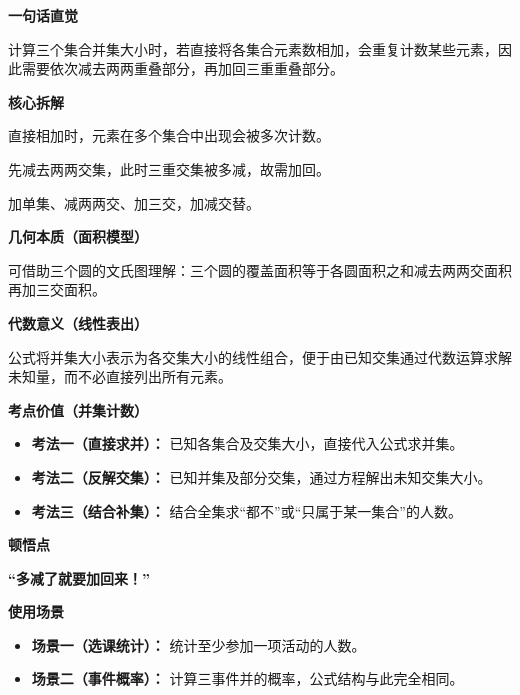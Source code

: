\begin{explanationbox}
	\textbf{\textcolor{CExplanation}{一句话直觉}}

	计算三个集合并集大小时，若直接将各集合元素数相加，会重复计数某些元素，因此需要依次减去两两重叠部分，再加回三重重叠部分。

	\medskip
	\textbf{\textcolor{CExplanation}{核心拆解}}
	\begin{description}[style=nextline, leftmargin=2.8em, labelsep=0.5em, itemsep=0.45em]
		\item[\textbf{要点一（重复计数）：}] 直接相加时，元素在多个集合中出现会被多次计数。
		\item[\textbf{要点二（逐步修正）：}] 先减去两两交集，此时三重交集被多减，故需加回。
		\item[\textbf{要点三（符号交替）：}] 加单集、减两两交、加三交，加减交替。
	\end{description}

	\medskip
	\textbf{\textcolor{CExplanation}{几何本质（面积模型）}}

	可借助三个圆的文氏图理解：三个圆的覆盖面积等于各圆面积之和减去两两交面积再加三交面积。

	\medskip
	\textbf{\textcolor{CExplanation}{代数意义（线性表出）}}

	公式将并集大小表示为各交集大小的线性组合，便于由已知交集通过代数运算求解未知量，而不必直接列出所有元素。

	\medskip
	\textbf{\textcolor{CExplanation}{考点价值（并集计数）}}
	\begin{itemize}[leftmargin=*, itemsep=0.5em, topsep=0.4em]
		\item \textbf{考法一（直接求并）：} 已知各集合及交集大小，直接代入公式求并集。
		\item \textbf{考法二（反解交集）：} 已知并集及部分交集，通过方程解出未知交集大小。
		\item \textbf{考法三（结合补集）：} 结合全集求“都不”或“只属于某一集合”的人数。
	\end{itemize}

	\medskip
	\textbf{\textcolor{CExplanation}{顿悟点}}

	\textbf{“多减了就要加回来！”}

	\medskip
	\textbf{\textcolor{CExplanation}{使用场景}}
	\begin{itemize}[leftmargin=*, itemsep=0.5em, topsep=0.4em]
		\item \textbf{场景一（选课统计）：} 统计至少参加一项活动的人数。
		\item \textbf{场景二（事件概率）：} 计算三事件并的概率，公式结构与此完全相同。
	\end{itemize}
\end{explanationbox}
